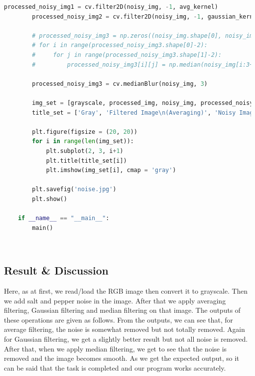 \documentclass{article}
\begin{document}
{\begin{lstlisting}[language=Python, caption=Code for performing average filtering, Gaussian filtering and median filtering in a salt and pepper noisy image]
        processed_noisy_img1 = cv.filter2D(noisy_img, -1, avg_kernel)
        processed_noisy_img2 = cv.filter2D(noisy_img, -1, gaussian_kernel)
    
        # processed_noisy_img3 = np.zeros((noisy_img.shape[0], noisy_img.shape[1]))
        # for i in range(processed_noisy_img3.shape[0]-2):
        #     for j in range(processed_noisy_img3.shape[1]-2):
        #         processed_noisy_img3[i][j] = np.median(noisy_img[i:3+i, j:3+j])
    
        processed_noisy_img3 = cv.medianBlur(noisy_img, 3)
    
        img_set = [grayscale, processed_img, noisy_img, processed_noisy_img1, processed_noisy_img2, processed_noisy_img3]
        title_set = ['Gray', 'Filtered Image\n(Averaging)', 'Noisy Image\n(Salt & Pepper)', 'Filtered Noisy Image\n(Average Filter)', 'Filtered Noisy Image\n(Gaussian Filter)', 'Filtered Noisy Image\n(Median Filter)']
        
        plt.figure(figsize = (20, 20))
        for i in range(len(img_set)):
            plt.subplot(2, 3, i+1)
            plt.title(title_set[i])
            plt.imshow(img_set[i], cmap = 'gray')
    
        plt.savefig('noise.jpg')
        plt.show()
    
    if __name__ == "__main__":
        main()

    \end{lstlisting}
    \\
    
    \subsection{Result & Discussion}{
        Here, as at first, we read/load the RGB image then convert it to grayscale. Then we add salt and pepper noise in the image. After that we apply averaging filtering, Gaussian filtering and median filtering on that image. The outputs of these operations are given as follows. From the outputs, we can see that, for average filtering, the noise is somewhat removed but not totally removed. Again for Gaussian filtering, we get a slightly better result but not all noise is removed. After that, when we apply median filtering, we get to see that the noise is removed and the image becomes smooth. As we get the expected output, so it can be said that the task is completed and our program works accurately.
        
}}
\end{document}
